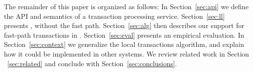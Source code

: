 The remainder of this paper is organized as follows:
In Section~\ref{sec:api} we define the  API and semantics of a transaction processing service. 
Section~\ref{sec:ll} presents \sys, without the fast path. 
Section~\ref{sec:alg} then describes our support for fast-path  transactions in \sys.  
Section~\ref{sec:eval} presents an empirical evaluation.
In Section~\ref{sec:context} we generalize the local transactions algorithm, and explain how it could be implemented in 
other systems. We review related work in Section ~\ref{sec:related} and conclude with Section~\ref{sec:conclusions}.

